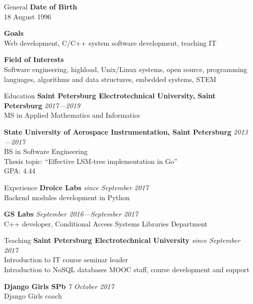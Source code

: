 \documentclass{resume}
\begin{document}
\begin{rSection}{General}
    {\bf Date of Birth} \\
        18 August 1996

    {\bf Goals} \\
        Web development, C\slash C++ system software development, teaching IT

    {\bf Field of Interests} \\
        Software engineering, highload, Unix\slash Linux systems, open source, programming languages, algorithms and data structures, embedded systems, STEM
\end{rSection}

\begin{rSection}{Education}
    {\bf Saint Petersburg Electrotechnical University, Saint Petersburg} \hfill {\em 2017---2019} \\ 
    MS in Applied Mathematics and Informatics
    
    {\bf State University of Aerospace Instrumentation, Saint Petersburg} \hfill {\em 2013---2017} \\ 
    BS in Software Engineering \\
    Thesis topic: ``Effective LSM-tree implementation in Go'' \\
    GPA: 4.44
\end{rSection}

\begin{rSection}{Experience}
    {\bf Droice Labs} \hfill {\em since September 2017} \\
        Backend modules development in Python
    
    {\bf GS Labs} \hfill {\em September 2016---September 2017} \\
        C++ developer, Conditional Access Systems Libraries Department
\end{rSection}

\begin{rSection}{Teaching}
    {\bf Saint Petersburg Electrotechnical University} \hfill {\em since September 2017} \\
        Introduction to IT course seminar leader \\
        Introduction to NoSQL databases MOOC staff, course development and support

    {\bf Django Girls SPb} \hfill {\em 7 October 2017} \\
        Django Girls coach
\end{rSection}
\end{document}
